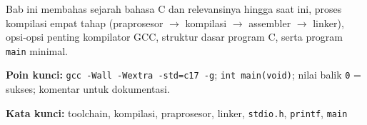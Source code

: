 \documentclass[../main.tex]{subfiles}
\begin{document}
\begin{rangkuman}
Bab ini membahas sejarah bahasa C dan relevansinya hingga saat ini, proses kompilasi empat tahap (praprosesor $\rightarrow$ kompilasi $\rightarrow$ assembler $\rightarrow$ linker), opsi-opsi penting kompilator GCC, struktur dasar program C, serta program \texttt{main} minimal.

\textbf{Poin kunci:} \texttt{gcc -Wall -Wextra -std=c17 -g}; \texttt{int main(void)}; nilai balik \texttt{0} = sukses; komentar untuk dokumentasi.

\textbf{Kata kunci:} toolchain, kompilasi, praprosesor, linker, \texttt{stdio.h}, \texttt{printf}, \texttt{main}
\end{rangkuman}
\end{document}
